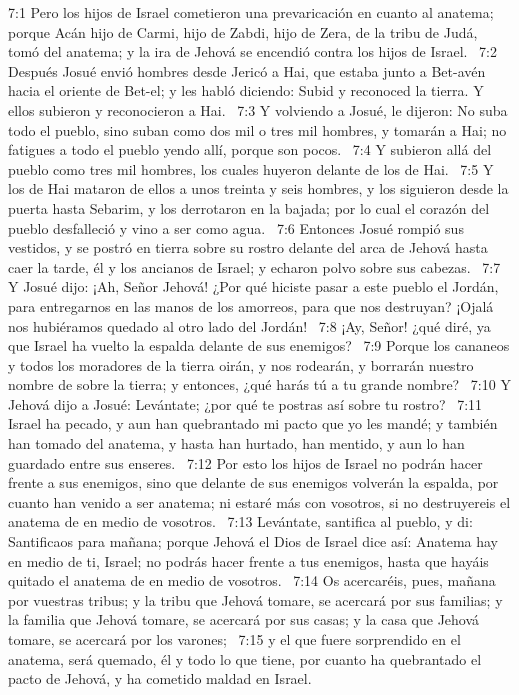 7:1 Pero los hijos de Israel cometieron una prevaricación en cuanto al anatema; porque Acán hijo de Carmi, hijo de Zabdi, hijo de Zera, de la tribu de Judá, tomó del anatema; y la ira de Jehová se encendió contra los hijos de Israel.  
7:2 Después Josué envió hombres desde Jericó a Hai, que estaba junto a Bet-avén hacia el oriente de Bet-el; y les habló diciendo: Subid y reconoced la tierra. Y ellos subieron y reconocieron a Hai.  
7:3 Y volviendo a Josué, le dijeron: No suba todo el pueblo, sino suban como dos mil o tres mil hombres, y tomarán a Hai; no fatigues a todo el pueblo yendo allí, porque son pocos.  
7:4 Y subieron allá del pueblo como tres mil hombres, los cuales huyeron delante de los de Hai.  
7:5 Y los de Hai mataron de ellos a unos treinta y seis hombres, y los siguieron desde la puerta hasta Sebarim, y los derrotaron en la bajada; por lo cual el corazón del pueblo desfalleció y vino a ser como agua.  
7:6 Entonces Josué rompió sus vestidos, y se postró en tierra sobre su rostro delante del arca de Jehová hasta caer la tarde, él y los ancianos de Israel; y echaron polvo sobre sus cabezas.  
7:7 Y Josué dijo: ¡Ah, Señor Jehová! ¿Por qué hiciste pasar a este pueblo el Jordán, para entregarnos en las manos de los amorreos, para que nos destruyan? ¡Ojalá nos hubiéramos quedado al otro lado del Jordán!  
7:8 ¡Ay, Señor! ¿qué diré, ya que Israel ha vuelto la espalda delante de sus enemigos?  
7:9 Porque los cananeos y todos los moradores de la tierra oirán, y nos rodearán, y borrarán nuestro nombre de sobre la tierra; y entonces, ¿qué harás tú a tu grande nombre?  
7:10 Y Jehová dijo a Josué: Levántate; ¿por qué te postras así sobre tu rostro?  
7:11 Israel ha pecado, y aun han quebrantado mi pacto que yo les mandé; y también han tomado del anatema, y hasta han hurtado, han mentido, y aun lo han guardado entre sus enseres.  
7:12 Por esto los hijos de Israel no podrán hacer frente a sus enemigos, sino que delante de sus enemigos volverán la espalda, por cuanto han venido a ser anatema; ni estaré más con vosotros, si no destruyereis el anatema de en medio de vosotros.  
7:13 Levántate, santifica al pueblo, y di: Santificaos para mañana; porque Jehová el Dios de Israel dice así: Anatema hay en medio de ti, Israel; no podrás hacer frente a tus enemigos, hasta que hayáis quitado el anatema de en medio de vosotros.  
7:14 Os acercaréis, pues, mañana por vuestras tribus; y la tribu que Jehová tomare, se acercará por sus familias; y la familia que Jehová tomare, se acercará por sus casas; y la casa que Jehová tomare, se acercará por los varones;  
7:15 y el que fuere sorprendido en el anatema, será quemado, él y todo lo que tiene, por cuanto ha quebrantado el pacto de Jehová, y ha cometido maldad en Israel.  
